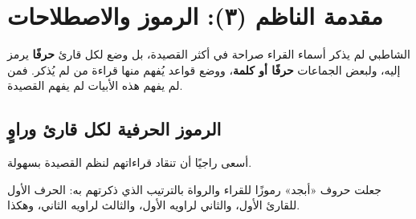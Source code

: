 \chapter{مقدمة الناظم (٣): الرموز والاصطلاحات}

\begin{tanbih}
الشاطبي لم يذكر أسماء القراء صراحة في أكثر القصيدة، بل وضع لكل قارئ \textbf{حرفًا} يرمز إليه، ولبعض الجماعات \textbf{حرفًا أو كلمة}، ووضع قواعد يُفهم منها قراءة من لم يُذكر. فمن لم يفهم هذه الأبيات لم يفهم القصيدة.
\end{tanbih}

\section{الرموز الحرفية لكل قارئ وراوٍ}

\begin{mufradat}
\end{mufradat}
\maana أسعى راجيًا أن تنقاد قراءاتهم لنظم القصيدة بسهولة.

\begin{mufradat}
\end{mufradat}
\maana جعلت حروف «أبجد» رموزًا للقراء والرواة بالترتيب الذي ذكرتهم به: الحرف الأول للقارئ الأول، والثاني لراويه الأول، والثالث لراويه الثاني، وهكذا.

